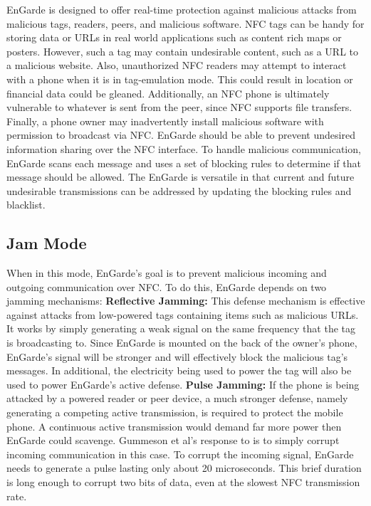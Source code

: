\documentclass{sig-alternate}
\begin{document}
EnGarde is designed to offer real-time protection against malicious attacks from malicious tags, readers, peers, and malicious software. NFC tags can be handy for storing data or URLs in real world applications such as content rich maps or posters. However, such a tag may contain undesirable content, such as a URL to a malicious website. Also, unauthorized NFC readers may attempt to interact with a phone when it is in tag-emulation mode. This could result in location or financial data could be gleaned. Additionally, an NFC phone is ultimately vulnerable to whatever is sent from the peer, since NFC supports file transfers. Finally, a phone owner may inadvertently install malicious software with permission to broadcast via NFC. EnGarde should be able to prevent undesired information sharing over the NFC interface.
\vspace{2mm}\newline
To handle malicious communication, EnGarde scans each message and uses a set of blocking rules to determine if that message should be allowed. The EnGarde is versatile in that current and future undesirable transmissions can be addressed by updating the blocking rules and blacklist.

\subsection{Jam Mode}
When in this mode, EnGarde's goal is to prevent malicious incoming and outgoing communication over NFC. To do this, EnGarde depends on two jamming mechanisms:
\vspace{2mm}\newline
\noindent\textbf{Reflective Jamming:} This defense mechanism is effective against attacks from low-powered tags containing items such as malicious URLs. It works by simply generating a weak signal on the same frequency that the tag is broadcasting to. Since EnGarde is mounted on the back of the owner's phone, EnGarde's signal will be stronger and will effectively block the malicious tag's messages. In additional, the electricity being used to power the tag will also be used to power EnGarde's active defense.
\vspace{2mm}\newline
\noindent\textbf{Pulse Jamming:} If the phone is being attacked by a powered reader or peer device, a much stronger defense, namely generating a competing active transmission, is required to protect the mobile phone. A continuous active transmission would demand far more power then EnGarde could scavenge. Gummeson et al's response to is to simply corrupt incoming communication in this case. To corrupt the incoming signal, EnGarde needs to generate a pulse lasting only about 20 microseconds. This brief duration is long enough to corrupt two bits of data, even at the slowest NFC transmission rate.
\end{document}
